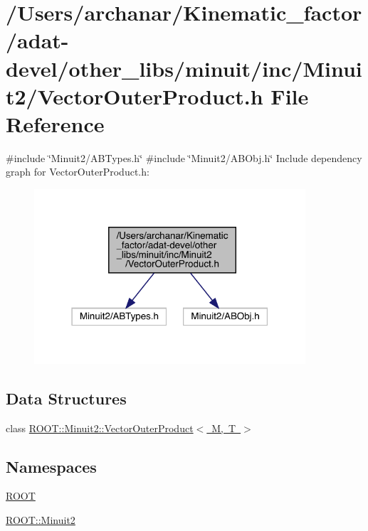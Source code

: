 \hypertarget{adat-devel_2other__libs_2minuit_2inc_2Minuit2_2VectorOuterProduct_8h}{}\section{/\+Users/archanar/\+Kinematic\+\_\+factor/adat-\/devel/other\+\_\+libs/minuit/inc/\+Minuit2/\+Vector\+Outer\+Product.h File Reference}
\label{adat-devel_2other__libs_2minuit_2inc_2Minuit2_2VectorOuterProduct_8h}
{\ttfamily \#include \char`\"{}Minuit2/\+A\+B\+Types.\+h\char`\"{}}\newline
{\ttfamily \#include \char`\"{}Minuit2/\+A\+B\+Obj.\+h\char`\"{}}\newline
Include dependency graph for Vector\+Outer\+Product.\+h\+:
\nopagebreak
\begin{figure}[H]
\begin{center}
\leavevmode
\includegraphics[width=286pt]{de/dbe/adat-devel_2other__libs_2minuit_2inc_2Minuit2_2VectorOuterProduct_8h__incl}
\end{center}
\end{figure}
\subsection*{Data Structures}
\begin{DoxyCompactItemize}
\item 
class \mbox{\hyperlink{classROOT_1_1Minuit2_1_1VectorOuterProduct}{R\+O\+O\+T\+::\+Minuit2\+::\+Vector\+Outer\+Product$<$ M, T $>$}}
\end{DoxyCompactItemize}
\subsection*{Namespaces}
\begin{DoxyCompactItemize}
\item 
 \mbox{\hyperlink{namespaceROOT}{R\+O\+OT}}
\item 
 \mbox{\hyperlink{namespaceROOT_1_1Minuit2}{R\+O\+O\+T\+::\+Minuit2}}
\end{DoxyCompactItemize}
